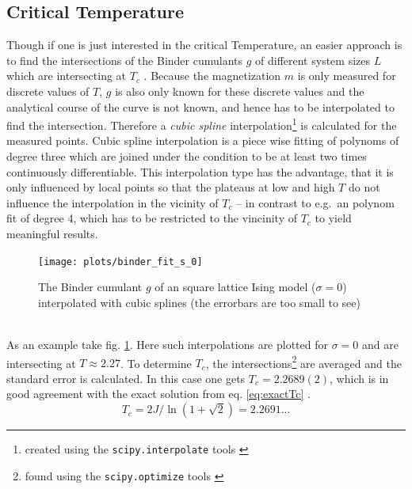 \subsection{Critical Temperature}
\label{ssec:binderIntersections}
    Though if one is just interested in the critical Temperature, an
    easier approach is to find the intersections of the Binder cumulants
    \(g\) of different system sizes \(L\) which are intersecting at
    \(T_c\) \cite{Binder1981}.
    Because the magnetization \(m\) is only measured for discrete values
    of \(T\), \(g\) is also only known for these discrete values and the
    analytical course of the curve is not known, and hence has
    to be interpolated to find the intersection. Therefore a \emph{cubic spline}
    interpolation\footnote{created using the \texttt{scipy.interpolate} tools \cite{scipy2001}}
    is calculated for the measured points.
    Cubic spline interpolation is a piece wise fitting of polynoms of
    degree three which are joined under the condition to be at least two
    times continuously differentiable. This interpolation type has the
    advantage, that it is only influenced by local points so that the
    plateaus at low and high \(T\) do not influence the interpolation in
    the vicinity of \(T_c\) -- in contrast to e.g.\ an polynom fit of
    degree 4, which has to be restricted to the vincinity of \(T_c\) to
    yield meaningful results.
    \begin{figure}[htbp]
        \centering
        \texttt{[image: plots/binder\_fit\_s\_0]}
        \caption[Example of a Binder Cumulant to Determine the Critical Temperature]
        {
            The Binder cumulant \(g\) of an square lattice Ising model
            (\(\sigma=0\)) interpolated with cubic splines
            (the errorbars are too small to see)\\
        }
        \label{fig:gettingCrit:binder_fit_s_0}
    \end{figure}\\
    As an example take fig. \ref{fig:gettingCrit:binder_fit_s_0}.
    Here such interpolations are plotted for \(\sigma=0\) and are
    intersecting at \(T \approx 2.27\).
    To determine \(T_c\), the intersections\footnote{found using the \texttt{scipy.optimize} tools \cite{scipy2001}}
    are averaged and the standard error is calculated. In this case one
    gets \(T_c = 2.2689(2)\), which is in good agreement with the
    exact solution from eq. \eqref{eq:exactTc} \cite{Onsager1944}.
    \begin{equation}
        T_c = 2J/\ln(1+\sqrt 2) = 2.2691...
        \label{eq:exactTc}
    \end{equation}
